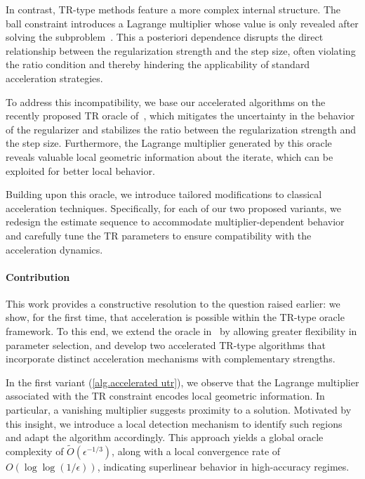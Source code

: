 \documentclass{article}
\begin{document}
In contrast, TR-type methods feature a more complex internal structure. The ball constraint introduces a Lagrange multiplier whose value is only revealed after solving the subproblem~\cite{nocedal1999numerical,cartis2022evaluation}. This a posteriori dependence disrupts the direct relationship between the regularization strength and the step size, often violating the ratio condition and thereby hindering the applicability of standard acceleration strategies.

To address this incompatibility, we base our accelerated algorithms on the recently proposed TR oracle of~\citet{jiang2024nonconvexityuniversaltrustregionmethod}, which mitigates the uncertainty in the behavior of the regularizer and stabilizes the ratio between the regularization strength and the step size. Furthermore, the Lagrange multiplier generated by this oracle reveals valuable local geometric information about the iterate, which can be exploited for better local behavior.

Building upon this oracle, we introduce tailored modifications to classical acceleration techniques. Specifically, for each of our two proposed variants, we redesign the estimate sequence to accommodate multiplier-dependent behavior and carefully tune the TR parameters to ensure compatibility with the acceleration dynamics.

\paragraph{Contribution}
This work provides a constructive resolution to the question raised earlier: we show, for the first time, that acceleration is possible within the TR-type oracle framework. To this end, we extend the oracle in~\citet{jiang2024nonconvexityuniversaltrustregionmethod} by allowing greater flexibility in parameter selection, and develop two accelerated TR-type algorithms that incorporate distinct acceleration mechanisms with complementary strengths.

In the first variant (\autoref{alg.accelerated utr}), we observe that the Lagrange multiplier associated with the TR constraint encodes local geometric information. In particular, a vanishing multiplier suggests proximity to a solution. Motivated by this insight, we introduce a local detection mechanism to identify such regions and adapt the algorithm accordingly. This approach yields a global oracle complexity of $\tilde{O}(\epsilon^{-1/3})$, along with a local convergence rate of $O(\log\log(1/\epsilon))$, indicating superlinear behavior in high-accuracy regimes.
\end{document}
